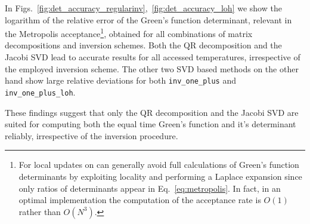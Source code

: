 \documentclass[submission, Phys]{SciPost}
\begin{document}
In Figs.~\ref{fig:det_accuracy_regularinv},~\ref{fig:det_accuracy_loh} we show the logarithm of the relative error of the Green's function determinant, relevant in the Metropolis acceptance\footnote{For local updates on can generally avoid full calculations of Green's function determinants by exploiting locality and performing a Laplace expansion since only ratios of determinants appear in Eq.~\ref{eq:metropolis}. In fact, in an optimal implementation the computation of the acceptance rate is $O(1)$ rather than $O(N^3)$.}, obtained for all combinations of matrix decompositions and inversion schemes. Both the QR decomposition and the Jacobi SVD lead to accurate results for all accessed temperatures, irrespective of the employed inversion scheme. The other two SVD based methods on the other hand show large relative deviations for both \texttt{inv\_one\_plus} and \texttt{inv\_one\_plus\_loh}.

These findings suggest that only the QR decomposition and the Jacobi SVD are suited for computing both the equal time Green's function and it's determinant reliably, irrespective of the inversion procedure.

%
%
%
%		
%
%
%
\end{document}
